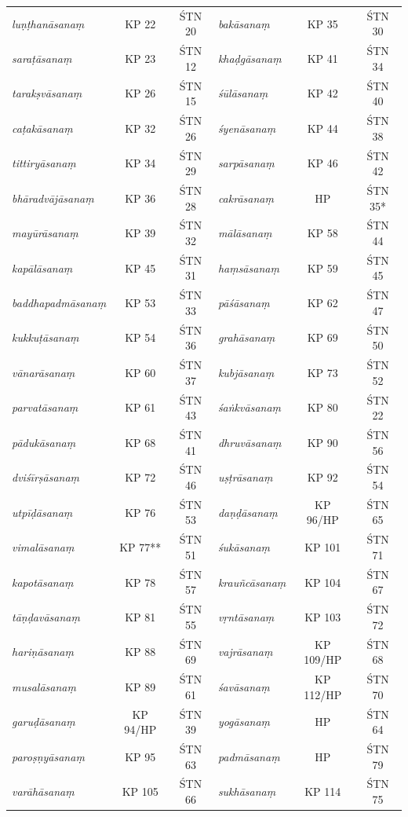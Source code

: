 \begin{longtable}{lcclcc}
\emph{luṇṭhanāsanaṃ} & KP 22 & ŚTN 20 & \emph{bakāsanaṃ} & KP 35 & ŚTN 30 \\
\emph{saraṭāsanaṃ} & KP 23 & ŚTN 12 & \emph{khaḍgāsanaṃ} & KP 41 & ŚTN 34 \\
\emph{tarakṣvāsanaṃ} & KP 26 & ŚTN 15 & \emph{śūlāsanaṃ} & KP 42 & ŚTN 40 \\
\emph{caṭakāsanaṃ} & KP 32 & ŚTN 26 & \emph{śyenāsanaṃ} & KP 44 & ŚTN 38 \\
\emph{tittiryāsanaṃ} & KP 34 & ŚTN 29 & \emph{sarpāsanaṃ} & KP 46 & ŚTN 42 \\
\emph{bhāradvājāsanaṃ} & KP 36 & ŚTN 28 & \emph{cakrāsanaṃ} & HP & ŚTN 35* \\
\emph{mayūrāsanaṃ} & KP 39 & ŚTN 32 & \emph{mālāsanaṃ} & KP 58 & ŚTN 44 \\
\emph{kapālāsanaṃ} & KP 45 & ŚTN 31 & \emph{haṃsāsanaṃ} & KP 59 & ŚTN 45 \\
\emph{baddhapadmāsanaṃ} & KP 53 & ŚTN 33 & \emph{pāśāsanaṃ} & KP 62 & ŚTN 47 \\
\emph{kukkuṭāsanaṃ} & KP 54 & ŚTN 36 & \emph{grahāsanaṃ} & KP 69 & ŚTN 50 \\
\emph{vānarāsanaṃ} & KP 60 & ŚTN 37 & \emph{kubjāsanaṃ} & KP 73 & ŚTN 52 \\
\emph{parvatāsanaṃ} & KP 61 & ŚTN 43 & \emph{śaṅkvāsanaṃ} & KP 80 & ŚTN 22 \\
\emph{pādukāsanaṃ} & KP 68 & ŚTN 41 & \emph{dhruvāsanaṃ} & KP 90 & ŚTN 56 \\
\emph{dviśīrṣāsanaṃ} & KP 72 & ŚTN 46 & \emph{uṣṭrāsanaṃ} & KP 92 & ŚTN 54 \\
\emph{utpīḍāsanaṃ} & KP 76 & ŚTN 53 & \emph{daṇḍāsanaṃ} & KP 96/HP & ŚTN 65 \\
\emph{vimalāsanaṃ} & KP 77** & ŚTN 51 & \emph{śukāsanaṃ} & KP 101 & ŚTN 71 \\
\emph{kapotāsanaṃ} & KP 78 & ŚTN 57 & \emph{krauñcāsanaṃ} & KP 104 & ŚTN 67 \\
\emph{tāṇḍavāsanaṃ} & KP 81 & ŚTN 55 & \emph{vṛntāsanaṃ} & KP 103 & ŚTN 72 \\
\emph{hariṇāsanaṃ} & KP 88 & ŚTN 69 & \emph{vajrāsanaṃ} & KP 109/HP & ŚTN 68 \\
\emph{musalāsanaṃ} & KP 89 & ŚTN 61 & \emph{śavāsanaṃ} & KP 112/HP & ŚTN 70 \\
\emph{garuḍāsanaṃ} & KP 94/HP & ŚTN 39 & \emph{yogāsanaṃ} & HP & ŚTN 64 \\
\emph{paroṣṇyāsanaṃ} & KP 95 & ŚTN 63 & \emph{padmāsanaṃ} & HP & ŚTN 79 \\
\emph{varāhāsanaṃ} & KP 105 & ŚTN 66 & \emph{sukhāsanaṃ} & KP 114 & ŚTN 75 \\

\end{longtable}
